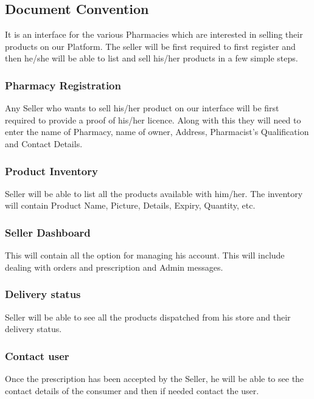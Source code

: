 \documentclass[fleqn,10pt]{../SelfArx} %
\begin{document}
\subsection{Document Convention}

It is an interface for the various Pharmacies which are interested in selling their products on our Platform. The seller will be first required to first register and then he/she will be able to list and sell his/her products in a few simple steps.
\subsubsection{Pharmacy Registration}

Any Seller who wants to sell his/her product on our interface will be first required to provide a proof of his/her licence. Along with this they will need to enter the name of Pharmacy, name of owner, Address, Pharmacist’s Qualification and Contact Details. 
\subsubsection{Product Inventory}

Seller will be able to list all the products available with him/her. The inventory will contain Product Name, Picture, Details, Expiry, Quantity, etc.
\subsubsection{Seller Dashboard}

This will contain all the option for managing his account. This will include dealing with orders and prescription and Admin messages.

\subsubsection{Delivery status}
Seller will be able to see all the products dispatched from his store and their delivery status.
\subsubsection{Contact user}
Once the prescription has been accepted by the Seller, he will be able to see the contact details of the consumer and then if needed contact the user.
\end{document}
